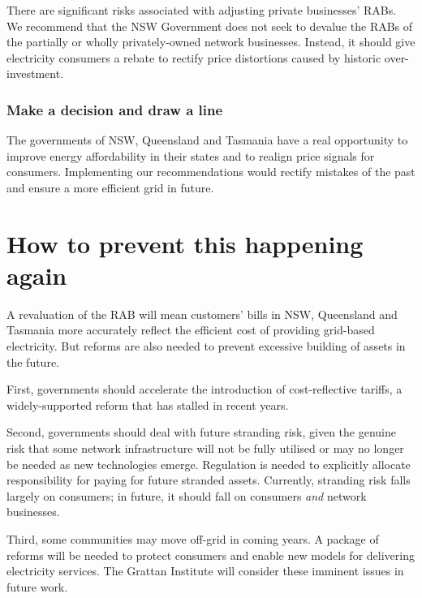 \documentclass[FrontPage]{grattan}
\begin{document}
There are significant risks associated with adjusting private businesses' RABs. We recommend that the NSW Government does not seek to devalue the RABs of the partially or wholly privately-owned network businesses. Instead, it should give electricity consumers a rebate to rectify price distortions caused by historic over-investment. 


\subsection{Make a decision and draw a line}
The governments of NSW, Queensland and Tasmania have a real opportunity to improve energy affordability in their states and to realign price signals for consumers. Implementing our recommendations would rectify mistakes of the past and ensure a more efficient grid in future.


\chapter{How to prevent this happening again}\label{chap:looking-forward-to-prevent-this-happening-again}
A revaluation of the RAB will mean customers' bills in NSW, Queensland and Tasmania more accurately reflect the efficient cost of providing grid-based electricity. But reforms are also needed to prevent excessive building of assets in the future. 

First, governments should accelerate the introduction of cost-reflective tariffs, a widely-supported reform that has stalled in recent years. 

Second, governments should deal with future stranding risk, given the genuine risk that some network infrastructure will not be fully utilised or may no longer be needed as new technologies emerge. Regulation is needed to explicitly allocate responsibility for paying for future stranded assets. Currently, stranding risk falls largely on consumers; in future, it should fall on consumers \textit{and} network businesses. 

Third, some communities may move off-grid in coming years. A package of reforms will be needed to protect consumers and enable new models for delivering electricity services. The Grattan Institute will consider these imminent issues in future work. 


\end{document}
